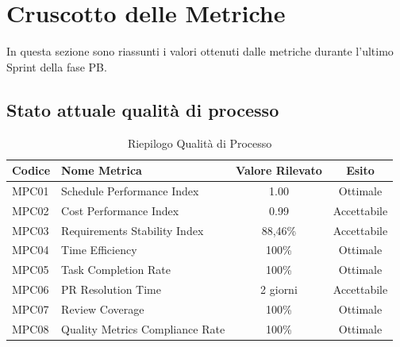 \newpage
\section{Cruscotto delle Metriche}
In questa sezione sono riassunti i valori ottenuti dalle metriche durante l'ultimo Sprint della fase PB.

\subsection{Stato attuale qualità di processo}
\begin{table}[H]
    \centering
    \renewcommand{\arraystretch}{1.3}
    \begin{tabularx}{\textwidth}{|l|X|c|c|}
        \hline
        \rowcolor{primarycolor!10}
        \textbf{Codice} & \textbf{Nome Metrica} & \textbf{Valore Rilevato} & \textbf{Esito} \\
        \hline
        MPC01 & Schedule Performance Index & 1.00 & Ottimale \\
        \hline
        MPC02 & Cost Performance Index & 0.99 & Accettabile \\
        \hline
        MPC03 & Requirements Stability Index & 88,46\% & Accettabile \\
        \hline
        MPC04 & Time Efficiency & 100\% & Ottimale \\
        \hline
        MPC05 & Task Completion Rate & 100\% & Ottimale \\
        \hline
        MPC06 & PR Resolution Time & 2 giorni & Accettabile \\
        \hline
        MPC07 & Review Coverage & 100\% & Ottimale \\
        \hline
        MPC08 & Quality Metrics Compliance Rate & 100\% & Ottimale \\
        \hline
    \end{tabularx}
    \caption{Riepilogo Qualità di Processo}
\end{table}

